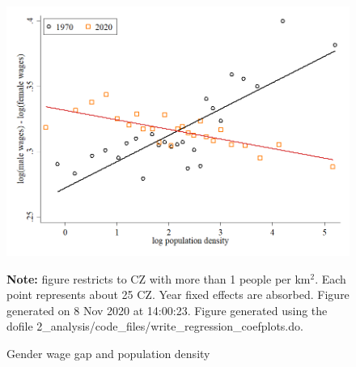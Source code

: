 \begin{figure}[!h]
\centering
\caption{Gender wage gap and population density}
\includegraphics[width=1\textwidth]{../2_analysis/output/figures/l_czone_density_1970_vs_2020}
\par \begin{minipage}[h]{\textwidth}{\tiny\textbf{Note:} figure restricts to CZ with more than 1 people per km$^2$. Each point represents about 25 CZ. Year fixed effects are absorbed. Figure generated on  8 Nov 2020 at 14:00:23. Figure generated using the dofile 2\_analysis/code\_files/write\_regression\_coefplots.do.}\end{minipage}
\end{figure}

